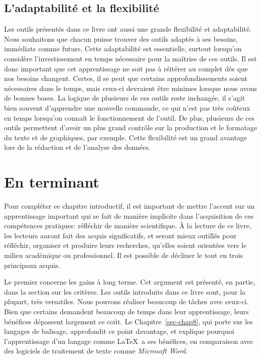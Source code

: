 \documentclass[
  letterpaper,
  DIV=11,
  numbers=noendperiod,
  oneside]{scrreprt}
\begin{document}
\hypertarget{ladaptabilituxe9-et-la-flexibilituxe9}{%
\subsection{L'adaptabilité et la
flexibilité}\label{ladaptabilituxe9-et-la-flexibilituxe9}}

Les outils présentés dans ce livre ont aussi une grande flexibilité et
adaptabilité. Nous souhaitons que chacun puisse trouver des outils
adaptés à ses besoins, immédiats comme futurs. Cette adaptabilité est
essentielle, surtout lorsqu'on considère l'investissement en temps
nécessaire pour la maîtrise de ces outils. Il est donc important que cet
apprentissage ne soit pas à réitérer au complet dès que nos besoins
changent. Certes, il se peut que certains approfondissements soient
nécessaires dans le temps, mais ceux-ci devraient être minimes lorsque
nous avons de bonnes bases. La logique de plusieurs de ces outils reste
inchangée, il s'agit bien souvent d'apprendre une nouvelle commande, ce
qui n'est pas très coûteux en temps lorsqu'on connaît le fonctionnement
de l'outil. De plus, plusieurs de ces outils permettent d'avoir un plus
grand contrôle sur la production et le formatage du texte et de
graphiques, par exemple. Cette flexibilité est un grand avantage lors de
la rédaction et de l'analyse des données.

\hypertarget{en-terminant}{%
\section{En terminant}\label{en-terminant}}

Pour compléter ce chapitre introductif, il est important de mettre
l'accent sur un apprentissage important qui se fait de manière implicite
dans l'acquisition de ces compétences pratiques: réfléchir de manière
scientifique. À la lecture de ce livre, les lecteurs auront fait des
acquis significatifs, et seront mieux outillés pour réfléchir, organiser
et produire leurs recherches, qu'elles soient orientées vers le milieu
académique ou professionnel. Il est possible de décliner le tout en
trois principaux acquis.

Le premier concerne les gains à long terme. Cet argument est présenté,
en partie, dans la section sur les critères. Les outils introduits dans
ce livre sont, pour la plupart, très versatiles. Nous pouvons réaliser
beaucoup de tâches avec ceux-ci. Bien que certains demandent beaucoup de
temps dans leur apprentissage, leurs bénéfices dépassent largement ce
coût. Le Chapitre~\ref{sec-chap8}, qui porte sur les langages de
balisage, approfondit ce point davantage, et explique pourquoi
l'apprentissage d'un langage comme \LaTeX~a ses bénéfices, en
comparaison avec des logiciels de traitement de texte comme
\emph{Microsoft Word}.
\end{document}
